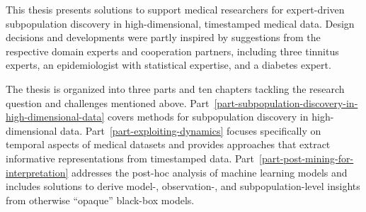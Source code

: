 \documentclass[
  oneside]{book}
\begin{document}
This thesis presents solutions to support medical researchers for expert-driven subpopulation discovery in high-dimensional, timestamped medical data.
Design decisions and developments were partly inspired by suggestions from the respective domain experts and cooperation partners, including three tinnitus experts, an epidemiologist with statistical expertise, and a diabetes expert.

The thesis is organized into three parts and ten chapters tackling the research question and challenges mentioned above.
Part~\ref{part-subpopulation-discovery-in-high-dimensional-data} covers methods for subpopulation discovery in high-dimensional data.
Part~\ref{part-exploiting-dynamics} focuses specifically on temporal aspects of medical datasets and provides approaches that extract informative representations from timestamped data.
Part~\ref{part-post-mining-for-interpretation} addresses the post-hoc analysis of machine learning models and includes solutions to derive model-, observation-, and subpopulation-level insights from otherwise ``opaque'' black-box models.
\end{document}
